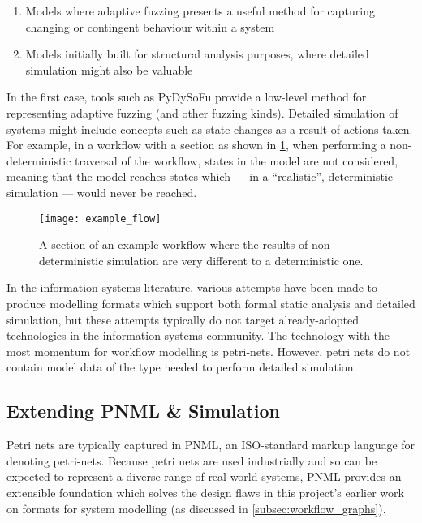 \documentclass[11pt]{article}
\newcommand{\ampersand}{\&}
\begin{document}
\begin{enumerate}
\item Models where adaptive fuzzing presents a useful method for capturing changing
or contingent behaviour within a system
\item Models initially built for structural analysis purposes, where detailed
simulation might also be valuable
\end{enumerate}

In the first case, tools such as PyDySoFu\cite{pdsf_repo} provide a low-level
method for representing adaptive fuzzing (and other fuzzing kinds). Detailed
simulation of systems might include concepts such as state changes as a result
of actions taken. For example, in a workflow with a section as shown in
\cref{fig:workflow_state}, when performing a non-deterministic traversal of the
workflow, states in the model are not considered, meaning that the model reaches
states which --- in a ``realistic'', deterministic simulation --- would never be
reached. 

\begin{figure}[h]
\centering
\texttt{[image: example\_flow]}
\caption{A section of an example workflow where the results of non-deterministic simulation are very different to a deterministic one.}
\label{fig:workflow_state}
\end{figure}

In the information systems literature, various attempts have been made to
produce modelling formats which support both formal static analysis and detailed
simulation\cite{bazoun2014business,dori1995object,aalst_generating_logs}, but
these attempts typically do not target already-adopted technologies in the
information systems community. The technology with the most momentum for
workflow modelling is petri-nets\cite{threegoodreasons}. However, petri nets do
not contain model data of the type needed to perform detailed simulation.

\subsection{Extending PNML \ampersand{} Simulation}
\label{sec:orga814c06}
\label{sec:future_notation} Petri nets are typically captured in
PNML\cite{iso_pnml}, an ISO-standard markup language for denoting petri-nets.
Because petri nets are used industrially and so can be expected to represent
a diverse range of real-world systems, PNML provides an extensible foundation
which solves the design flaws in this project's earlier work on formats for
system modelling (as discussed in \cref{subsec:workflow_graphs}).
\end{document}
